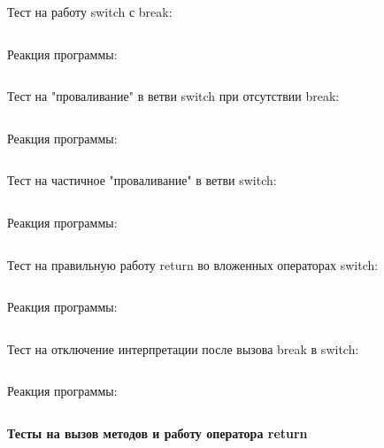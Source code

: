 \documentclass[a4paper,12pt]{article}
\begin{document}
Тест на работу switch с break:
\inputminted[breaklines,frame=lines,linenos]{java}{../src/test/fun-test/statements/Switch.java}
Реакция программы:
\inputminted[breaklines,frame=lines,linenos]{text}{../src/test/fun-test/statements/Switch.java.out}
Тест на "проваливание" в ветви switch при отсутствии break:
\inputminted[breaklines,frame=lines,linenos]{java}{../src/test/fun-test/statements/Fallthrough.java}
Реакция программы:
\inputminted[breaklines,frame=lines,linenos]{text}{../src/test/fun-test/statements/Fallthrough.java.out}
Тест на частичное "проваливание" в ветви switch:
\inputminted[breaklines,frame=lines,linenos]{java}{../src/test/fun-test/statements/SemiFallthrough.java}
Реакция программы:
\inputminted[breaklines,frame=lines,linenos]{text}{../src/test/fun-test/statements/SemiFallthrough.java.out}
Тест на правильную работу return во вложенных операторах switch:
\inputminted[breaklines,frame=lines,linenos]{java}{../src/test/fun-test/statements/NestedSwitch.java}
Реакция программы:
\inputminted[breaklines,frame=lines,linenos]{text}{../src/test/fun-test/statements/NestedSwitch.java.out}
Тест на отключение интерпретации после вызова break в switch:
\inputminted[breaklines,frame=lines,linenos]{java}{../src/test/fun-test/statements/NoStatementsAfterBreak.java}
Реакция программы:
\inputminted[breaklines,frame=lines,linenos]{text}{../src/test/fun-test/statements/NoStatementsAfterBreak.java.out}
\textbf{Тесты на вызов методов и работу оператора return}
\end{document}
